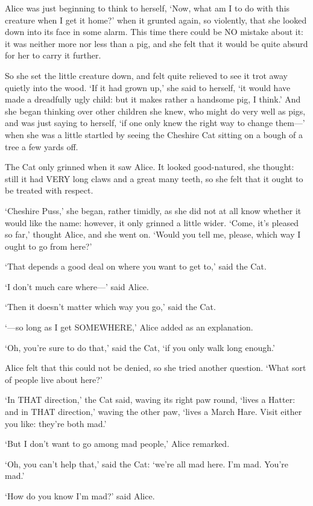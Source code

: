 \documentclass[12pt]{article}
\begin{document}
\begin{Parallel}[p]{}{}
{Alice was just beginning to think to herself, ‘Now, what am I to do with this creature when I get it home?’ when it grunted again, so violently, that she looked down into its face in some alarm. This time there could be NO mistake about it: it was neither more nor less than a pig, and she felt that it would be quite absurd for her to carry it further.

So she set the little creature down, and felt quite relieved to see it trot away quietly into the wood. ‘If it had grown up,’ she said to herself, ‘it would have made a dreadfully ugly child: but it makes rather a handsome pig, I think.’ And she began thinking over other children she knew, who might do very well as pigs, and was just saying to herself, ‘if one only knew the right way to change them—’ when she was a little startled by seeing the Cheshire Cat sitting on a bough of a tree a few yards off.

The Cat only grinned when it saw Alice. It looked good-natured, she thought: still it had VERY long claws and a great many teeth, so she felt that it ought to be treated with respect.

‘Cheshire Puss,’ she began, rather timidly, as she did not at all know whether it would like the name: however, it only grinned a little wider. ‘Come, it’s pleased so far,’ thought Alice, and she went on. ‘Would you tell me, please, which way I ought to go from here?’

‘That depends a good deal on where you want to get to,’ said the Cat.

‘I don’t much care where—’ said Alice.

‘Then it doesn’t matter which way you go,’ said the Cat.

‘—so long as I get SOMEWHERE,’ Alice added as an explanation.

‘Oh, you’re sure to do that,’ said the Cat, ‘if you only walk long enough.’

Alice felt that this could not be denied, so she tried another question. ‘What sort of people live about here?’

‘In THAT direction,’ the Cat said, waving its right paw round, ‘lives a Hatter: and in THAT direction,’ waving the other paw, ‘lives a March Hare. Visit either you like: they’re both mad.’

‘But I don’t want to go among mad people,’ Alice remarked.

‘Oh, you can’t help that,’ said the Cat: ‘we’re all mad here. I’m mad. You’re mad.’

‘How do you know I’m mad?’ said Alice.

}
\end{Parallel}
\end{document}
